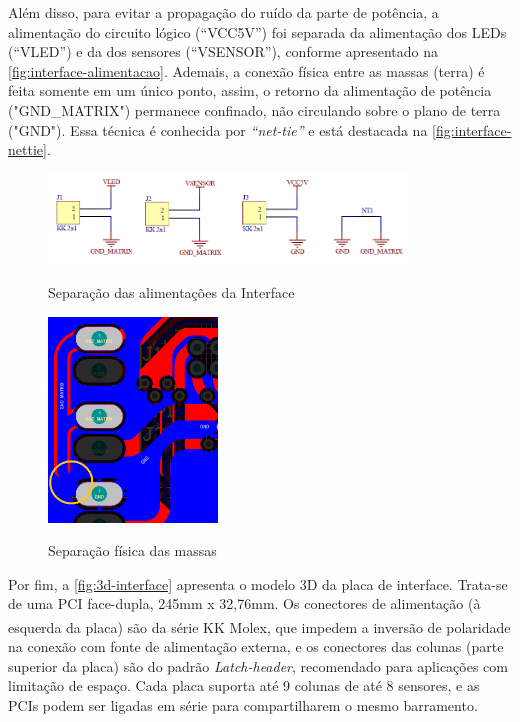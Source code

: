 Além disso, para evitar a propagação do ruído da parte de potência, a alimentação do circuito lógico (``VCC5V'') foi separada da alimentação dos LEDs (``VLED'') e da dos sensores (``VSENSOR''), conforme apresentado na \autoref{fig:interface-alimentacao}. Ademais, a conexão física entre as massas (terra) é feita somente em um único ponto, assim, o retorno da alimentação de potência ("GND\_MATRIX") permanece confinado, não circulando sobre o plano de terra ("GND"). Essa técnica é conhecida por \emph{``net-tie''} e está destacada na \autoref{fig:interface-nettie}.

\begin{figure}[H]
    \centering
    \caption{Separação das alimentações da Interface}
    \includegraphics[width=0.85\textwidth]{./dados/figuras/alimentacao-interface}
    \label{fig:interface-alimentacao}
\end{figure}

\begin{figure}[H]
    \centering
    \caption{Separação física das massas}
    \includegraphics[width=0.4\textwidth]{./dados/figuras/nt-interface}
    \label{fig:interface-nettie}
\end{figure}

Por fim, a \autoref{fig:3d-interface} apresenta o modelo 3D da placa de interface. Trata-se de uma PCI face-dupla, 245mm x 32,76mm. Os conectores de alimentação (à esquerda da placa) são da série KK Molex\textsuperscript{\textregistered}, que impedem a inversão de polaridade na conexão com fonte de alimentação externa, e os conectores das colunas (parte superior da placa) são do padrão \emph{Latch-header}, recomendado para aplicações com limitação de espaço. Cada placa suporta até 9 colunas de até 8 sensores, e as PCIs podem ser ligadas em série para compartilharem o mesmo barramento.

